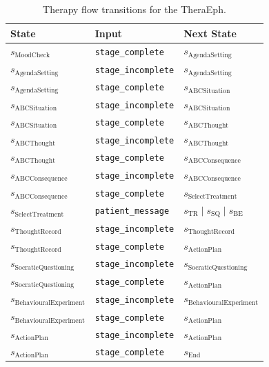 \documentclass[twoside]{report}
\begin{document}
\begin{table}[h!]
\centering
\small
\begin{tabular}{lll}
\toprule
\textbf{State} & \textbf{Input} & \textbf{Next State} \\
\midrule
$s_{\text{MoodCheck}}$              & \texttt{stage\_complete}    & $s_{\text{AgendaSetting}}$ \\
$s_{\text{AgendaSetting}}$          & \texttt{stage\_incomplete}  & $s_{\text{AgendaSetting}}$ \\
$s_{\text{AgendaSetting}}$          & \texttt{stage\_complete}    & $s_{\text{ABCSituation}}$ \\
$s_{\text{ABCSituation}}$           & \texttt{stage\_incomplete}  & $s_{\text{ABCSituation}}$ \\
$s_{\text{ABCSituation}}$           & \texttt{stage\_complete}    & $s_{\text{ABCThought}}$ \\
$s_{\text{ABCThought}}$             & \texttt{stage\_incomplete}  & $s_{\text{ABCThought}}$ \\
$s_{\text{ABCThought}}$             & \texttt{stage\_complete}    & $s_{\text{ABCConsequence}}$ \\
$s_{\text{ABCConsequence}}$         & \texttt{stage\_incomplete}  & $s_{\text{ABCConsequence}}$ \\
$s_{\text{ABCConsequence}}$         & \texttt{stage\_complete}    & $s_{\text{SelectTreatment}}$ \\
$s_{\text{SelectTreatment}}$        & \texttt{patient\_message}   & $s_{\text{TR}} \mid s_{\text{SQ}} \mid s_{\text{BE}}$ \\
$s_{\text{ThoughtRecord}}$          & \texttt{stage\_incomplete}  & $s_{\text{ThoughtRecord}}$ \\
$s_{\text{ThoughtRecord}}$          & \texttt{stage\_complete}    & $s_{\text{ActionPlan}}$ \\
$s_{\text{SocraticQuestioning}}$    & \texttt{stage\_incomplete}  & $s_{\text{SocraticQuestioning}}$ \\
$s_{\text{SocraticQuestioning}}$    & \texttt{stage\_complete}    & $s_{\text{ActionPlan}}$ \\
$s_{\text{BehaviouralExperiment}}$  & \texttt{stage\_incomplete}  & $s_{\text{BehaviouralExperiment}}$ \\
$s_{\text{BehaviouralExperiment}}$  & \texttt{stage\_complete}    & $s_{\text{ActionPlan}}$ \\
$s_{\text{ActionPlan}}$             & \texttt{stage\_incomplete}  & $s_{\text{ActionPlan}}$ \\
$s_{\text{ActionPlan}}$             & \texttt{stage\_complete}    & $s_{\text{End}}$ \\
\bottomrule
\end{tabular}
\caption{Therapy flow transitions for the TheraEph.}
\label{tab:fsm-therapy}
\end{table}
\end{document}
